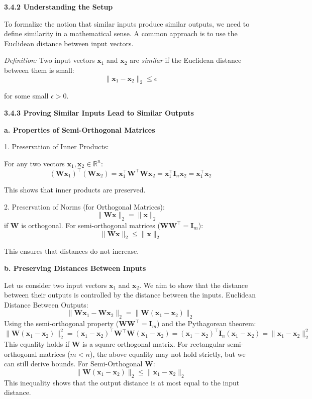 \documentclass{article}
\begin{document}
\textbf{3.4.2 Understanding the Setup}

To formalize the notion that similar inputs produce similar outputs, we need to define similarity in a mathematical sense. A common approach is to use the Euclidean distance between input vectors.

\textit{Definition:} Two input vectors \( \mathbf{x}_1 \) and \( \mathbf{x}_2 \) are \textit{similar} if the Euclidean distance between them is small:
\[
\|\mathbf{x}_1 - \mathbf{x}_2\|_2 \leq \epsilon
\]

for some small \( \epsilon > 0 \).


\textbf{3.4.3 Proving Similar Inputs Lead to Similar Outputs}

\textbf{a. Properties of Semi-Orthogonal Matrices}

1. Preservation of Inner Products:

   For any two vectors \( \mathbf{x}_1, \mathbf{x}_2 \in \mathbb{R}^n \):
  \[
   (\mathbf{W} \mathbf{x}_1)^\top (\mathbf{W} \mathbf{x}_2) = \mathbf{x}_1^\top \mathbf{W}^\top \mathbf{W} \mathbf{x}_2 = \mathbf{x}_1^\top \mathbf{I}_n \mathbf{x}_2 = \mathbf{x}_1^\top \mathbf{x}_2
   \]

   This shows that inner products are preserved.

2. Preservation of Norms (for Orthogonal Matrices):
  \[
   \|\mathbf{W} \mathbf{x}\|_2 = \|\mathbf{x}\|_2 \quad\] if  \( \mathbf{W} \) is orthogonal. For semi-orthogonal matrices (\( \mathbf{W} \mathbf{W}^\top = \mathbf{I}_m \)):
\[
   \|\mathbf{W} \mathbf{x}\|_2 \leq \|\mathbf{x}\|_2
   \]

   This ensures that distances do not increase.


\textbf{b. Preserving Distances Between Inputs}

Let us consider two input vectors \( \mathbf{x}_1 \) and \( \mathbf{x}_2 \). We aim to show that the distance between their outputs is controlled by the distance between the inputs. Euclidean Distance Between Outputs:
\[
\|\mathbf{W} \mathbf{x}_1 - \mathbf{W} \mathbf{x}_2\|_2 = \|\mathbf{W} (\mathbf{x}_1 - \mathbf{x}_2)\|_2
\]
Using the semi-orthogonal property (\( \mathbf{W} \mathbf{W}^\top = \mathbf{I}_m \)) and the Pythagorean theorem:
\[
\|\mathbf{W} (\mathbf{x}_1 - \mathbf{x}_2)\|_2^2 = (\mathbf{x}_1 - \mathbf{x}_2)^\top \mathbf{W}^\top \mathbf{W} (\mathbf{x}_1 - \mathbf{x}_2) = (\mathbf{x}_1 - \mathbf{x}_2)^\top \mathbf{I}_n (\mathbf{x}_1 - \mathbf{x}_2) = \|\mathbf{x}_1 - \mathbf{x}_2\|_2^2
\]
This equality holds if \( \mathbf{W} \) is a square orthogonal matrix. For rectangular semi-orthogonal matrices (\( m < n \)), the above equality may not hold strictly, but we can still derive bounds.
For Semi-Orthogonal \( \mathbf{W} \):
\[
\|\mathbf{W} (\mathbf{x}_1 - \mathbf{x}_2)\|_2 \leq \|\mathbf{x}_1 - \mathbf{x}_2\|_2
\]
This inequality shows that the output distance is at most equal to the input distance.
\end{document}
